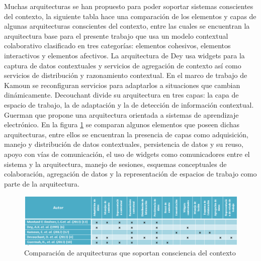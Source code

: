 Muchas arquitecturas se han propuesto para poder soportar sistemas conscientes del contexto, la siguiente tabla hace una comparaci\'on de los elementos y capas de algunas arquitecturas conscientes del contexto, entre las cuales se encuentran la arquitectura base para el presente trabajo que usa un modelo contextual colaborativo clasificado en tres categor\'ias: elementos cohesivos, elementos interactivos y elementos afectivos. La arquitectura de Dey\cite{dey1999architecture}  usa widgets para la captura de datos contextuales y servicios de agregaci\'on de contexto as\'i como servicios de distribuci\'on y razonamiento contextual. En el marco de trabajo de Kamoun \cite{kamoun2012fadyrcos}  se reconfiguran servicios para adaptarlos a situaciones que cambian din\'amicamente. Decouchant \cite{decouchant2013adapting} divide su arquitectura en tres capas: la capa de espacio de trabajo, la de adaptaci\'on y la de detecci\'on de informaci\'on contextual. Guerman  \cite{guermah2013ontology} que propone una arquitectura orientada a sistemas de aprendizaje electr\'onico. En la figura \ref{cmp:fig} se comparan algunos elementos que poseen dichas arquitecturas, entre ellos se encuentran la presencia de capas como adquisici\'on, manejo y distribuci\'on de datos contextuales, persistencia de datos y su reuso, apoyo con v\'ias de comunicaci\'on, el uso de widgets como comunicadores entre el sistema y la arquitectura, manejo de sesiones, esquemas conceptuales de colaboraci\'on, agregaci\'on de datos y la representaci\'on de espacios de trabajo como parte de la arquitectura.

\begin{figure}[h!]
  \centering
    \includegraphics[scale=0.5]{images/comparaciones}
  \caption{Comparaci\'on de arquitecturas que soportan consciencia del contexto\cite{montane2013context}\cite{dey1999architecture}\cite{kamoun2012fadyrcos}\cite{decouchant2013adapting}\cite{guermah2013ontology}}
  \label{cmp:fig}
\end{figure}
